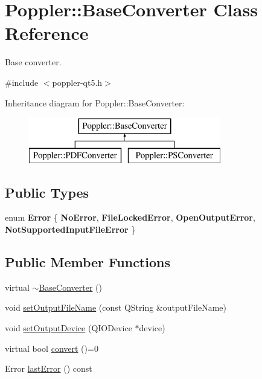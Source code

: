 \hypertarget{class_poppler_1_1_base_converter}{}\section{Poppler\+:\+:Base\+Converter Class Reference}
\label{class_poppler_1_1_base_converter}


Base converter.  




{\ttfamily \#include $<$poppler-\/qt5.\+h$>$}

Inheritance diagram for Poppler\+:\+:Base\+Converter\+:\begin{figure}[H]
\begin{center}
\leavevmode
\includegraphics[height=2.000000cm]{class_poppler_1_1_base_converter}
\end{center}
\end{figure}
\subsection*{Public Types}
\begin{DoxyCompactItemize}
\item 
\mbox{\label{class_poppler_1_1_base_converter_a0ed16d5e758b6a582541e131ab6b287c}} 
enum {\bfseries Error} \{ {\bfseries No\+Error}, 
{\bfseries File\+Locked\+Error}, 
{\bfseries Open\+Output\+Error}, 
{\bfseries Not\+Supported\+Input\+File\+Error}
 \}
\end{DoxyCompactItemize}
\subsection*{Public Member Functions}
\begin{DoxyCompactItemize}
\item 
virtual \hyperlink{class_poppler_1_1_base_converter_a10312b1e33c5536c195076bbe423c364}{$\sim$\+Base\+Converter} ()
\item 
void \hyperlink{class_poppler_1_1_base_converter_aadbbf56d2cfd70441513e771351d5882}{set\+Output\+File\+Name} (const Q\+String \&output\+File\+Name)
\item 
void \hyperlink{class_poppler_1_1_base_converter_a2cc2930a0cb160e8019589c75da0cccd}{set\+Output\+Device} (Q\+I\+O\+Device $\ast$device)
\item 
virtual bool \hyperlink{class_poppler_1_1_base_converter_a272756d051ce3795a89772eaa93cadca}{convert} ()=0
\item 
Error \hyperlink{class_poppler_1_1_base_converter_acade48d93b9ea0f09bdf3fa6a44b7f02}{last\+Error} () const
\end{DoxyCompactItemize}

